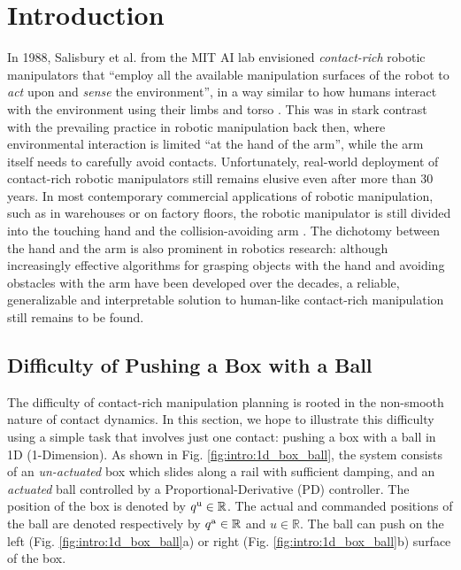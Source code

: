 % 

\chapter{Introduction}
In 1988, Salisbury et al. from the MIT AI lab envisioned \emph{contact-rich} robotic manipulators that ``employ all the available manipulation surfaces of the robot to \emph{act} upon and \emph{sense} the environment'', in a way similar to how humans interact with the environment using their limbs and torso \cite{salisbury1988preliminary}. This was in stark contrast with the prevailing practice in robotic manipulation back then, where environmental interaction is limited ``at the hand of the arm'', while the arm itself needs to carefully avoid contacts. Unfortunately, real-world deployment of contact-rich robotic manipulators still remains elusive even after more than 30 years. In most contemporary commercial applications of robotic manipulation, such as in warehouses or on factory floors, the robotic manipulator is still divided into the touching hand and the collision-avoiding arm \cite{beautifulamazon}. 
The dichotomy between the hand and the arm is also prominent in robotics research: although increasingly effective algorithms for grasping objects with the hand \cite[]{siciliano2008springer} and avoiding obstacles with the arm \cite{lavalle1998rapidly, marcucci2022motion} have been developed over the decades, a reliable, generalizable and interpretable solution to human-like contact-rich manipulation still remains to be found. 

\section{Difficulty of Pushing a Box with a Ball \label{sec:intro:box_ball_system}}
The difficulty of contact-rich manipulation planning is rooted in the non-smooth nature of contact dynamics. In this section, we hope to illustrate this difficulty using a simple task that involves just one contact: pushing a box with a ball in 1D (1-Dimension). 
As shown in Fig. \ref{fig:intro:1d_box_ball}, the system consists of an \emph{un-actuated} box which slides along a rail with sufficient damping, and an \emph{actuated} ball controlled by a Proportional-Derivative (PD) controller. 
The position of the box is denoted by ${q^\mathrm{u}} \in \mathbb{R}$. The actual and commanded positions of the ball are denoted respectively by ${q^\mathrm{a}} \in \mathbb{R}$ and $u \in \mathbb{R}$. 
The ball can push on the left (Fig. \ref{fig:intro:1d_box_ball}a) or right (Fig. \ref{fig:intro:1d_box_ball}b) surface of the box.

